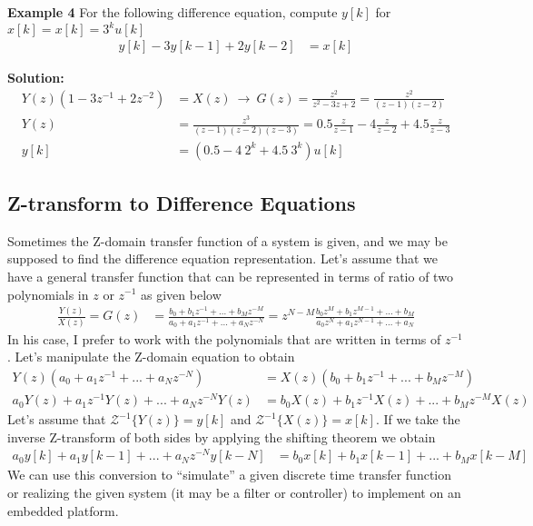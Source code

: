 \documentclass[twoside]{article}
\begin{document}
\textbf{Example 4} For the following difference equation, compute
$y[k]$ for $x[k] = x[k] = 3^k u[k]$
%
\begin{align*}
  y[k] - 3 y[k-1] + 2 y[k-2] &= x[k]
\end{align*}

\textbf{Solution:}
%
\begin{align*}
 Y(z) (1 - 3 z^{-1} + 2 z^{-2}) &= X(z) \ \rightarrow \ G(z) =
  \frac{z^2}{z^2 - 3 z + 2 } = \frac{z^2}{(z-1)(z-2)}
\\
Y(z) &= \frac{z^3}{(z-1)(z-2)(z-3)} = 0.5 \frac{z}{z-1} - 4 \frac{z}{z-2} +
     4.5  \frac{z}{z-3}   
\\
y[k] &= \left( 0.5 - 4 \ 2^k + 4.5 \ 3^k \right) u[k]
\end{align*}

\subsection*{Z-transform to Difference Equations}

Sometimes the Z-domain transfer function of a system is given, and 
we may be supposed to find the difference equation representation. 
Let's assume that we have a general transfer function that can be
represented in terms of ratio of two polynomials in $z$ or $z^{-1}$
as given below
%
\begin{align*}
\frac{Y(z)}{X(z)} = G(z) &= 
\frac{b_0 + b_{1} z^{-1} + ... + b_M z^{-M}}{a_0 + a_{1} z^{-1} + ... + a_N z^{-N}} = 
z^{N-M} 
\frac{b_0 z^{M} + b_{1} z^{M-1} + ... + b_M}{a_0 z^{N} + a_{1} z^{N-1} + ... + a_N}
\end{align*}
%
In his case, I prefer to work with the polynomials that are written in
terms of $z^{-1}$. Let's manipulate the Z-domain equation to obtain
%
\begin{align*}
Y(z) ( a_0 + a_{1} z^{-1} + ... + a_N z^{-N} ) &= X(z) ( b_0 + b_{1}
  z^{-1} + ... + b_M z^{-M} )
\\
a_0 Y(z) + a_{1} z^{-1} Y(z) + ... + a_N z^{-N} Y(z) &= b_0 X(z) + b_{1}
  z^{-1} X(z) + ... + b_M z^{-M} X(z)
\end{align*}
%
Let's assume that $\mathcal{Z}^{-1} \lbrace Y(z) \rbrace = y[k]$ 
and $\mathcal{Z}^{-1} \lbrace X(z) \rbrace = x[k]$. If we take the 
inverse Z-transform of both sides by applying the shifting theorem
we obtain
%
\begin{align*}
a_0 y[k] + a_{1} y[k-1] + ... + a_N z^{-N} y[k-N] &= b_0 x[k] + b_{1}
x[k-1] + ... + b_M x[k-M]
\end{align*}
%
We can use this conversion to ``simulate'' a given discrete time transfer
function or realizing the given system (it may be a filter or
controller) to implement on an embedded platform.  
\end{document}
